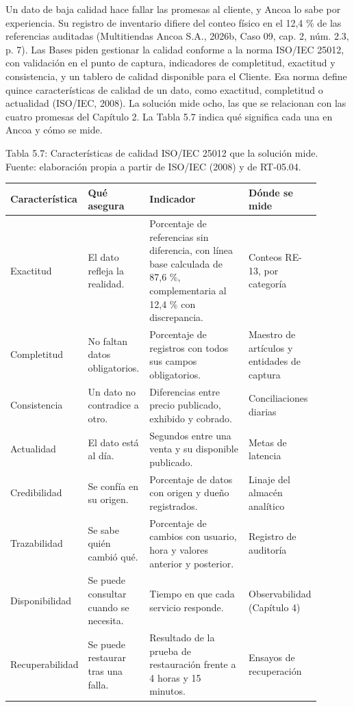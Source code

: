 \documentclass[11pt]{article}
\begin{document}
Un dato de baja calidad hace fallar las promesas al cliente, y Ancoa lo sabe por experiencia. Su registro de inventario difiere del conteo físico en el 12,4 \% de las referencias auditadas (Multitiendas Ancoa S.A., 2026b, Caso 09, cap. 2, núm. 2.3, p. 7). Las Bases piden gestionar la calidad conforme a la norma ISO/IEC 25012, con validación en el punto de captura, indicadores de completitud, exactitud y consistencia, y un tablero de calidad disponible para el Cliente. Esa norma define quince características de calidad de un dato, como exactitud, completitud o actualidad (ISO/IEC, 2008). La solución mide ocho, las que se relacionan con las cuatro promesas del Capítulo 2. La Tabla 5.7 indica qué significa cada una en Ancoa y cómo se mide.

\par\vspace{0.6\baselineskip}\noindent\begin{minipage}{\linewidth}
Tabla 5.7: Características de calidad ISO/IEC 25012 que la solución mide. Fuente: elaboración propia a partir de ISO/IEC (2008) y de RT-05.04.\label{tab:t12}\par\vspace{0.3\baselineskip}
\begin{tabular}{@{}p{0.109\linewidth}p{0.202\linewidth}p{0.383\linewidth}p{0.208\linewidth}@{}}
\toprule Característica & Qué asegura & Indicador & Dónde se mide \\
\midrule
Exactitud & El dato refleja la realidad. & Porcentaje de referencias sin diferencia, con línea base calculada de 87,6 \%, complementaria al 12,4 \% con discrepancia. & Conteos RE-13, por categoría \\
Completitud & No faltan datos obligatorios. & Porcentaje de registros con todos sus campos obligatorios. & Maestro de artículos y entidades de captura \\
Consistencia & Un dato no contradice a otro. & Diferencias entre precio publicado, exhibido y cobrado. & Conciliaciones diarias \\
Actualidad & El dato está al día. & Segundos entre una venta y su disponible publicado. & Metas de latencia \\
Credibilidad & Se confía en su origen. & Porcentaje de datos con origen y dueño registrados. & Linaje del almacén analítico \\
Trazabilidad & Se sabe quién cambió qué. & Porcentaje de cambios con usuario, hora y valores anterior y posterior. & Registro de auditoría \\
Disponibilidad & Se puede consultar cuando se necesita. & Tiempo en que cada servicio responde. & Observabilidad (Capítulo 4) \\
Recuperabilidad & Se puede restaurar tras una falla. & Resultado de la prueba de restauración frente a 4 horas y 15 minutos. & Ensayos de recuperación \\
\bottomrule
\end{tabular}
\end{minipage}
\par
\end{document}

